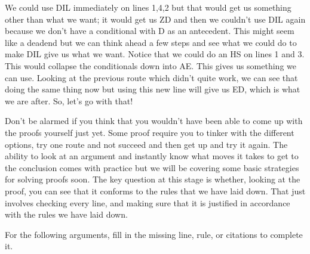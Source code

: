 We could use DIL immediately on lines 1,4,2 but that would get us something other than what we want; it would get us Z\eor D and then we couldn't use DIL again because we don't have a conditional with D as an antecedent. This might seem like a deadend but we can think ahead a few steps and see what we could do to make DIL give us what we want. Notice that we could do an HS on lines 1 and 3. This would collapse the conditionals down into A\eif E. This gives us something we can use. Looking at the previous route which didn't quite work, we can see that doing the same thing now but using this new line will give us E\eor D, which is what we are after. So, let's go with that!
\begin{fitchproof}
 
 
\end{fitchproof}

Don’t be alarmed if you think that you wouldn’t have been able to come up with the proofs yourself just yet. Some proof require you to tinker with the different options, try one route and not succeed and then get up and try it again. The ability to look at an argument and instantly know what moves it takes to get to the conclusion comes with practice but we will be covering some basic strategies for solving proofs soon. The key question at this stage is whether, looking at the proof, you can see that it conforms to the rules that we have laid down. That just involves checking every line, and making sure that it is justified in accordance with the rules we have laid down.

\practiceproblems
\problempart
\label{pr.fillinblankbasics}
For the following arguments, fill in the missing line, rule, or citations to complete it.
\begin{fitchproof}
 
\end{fitchproof}

\begin{fitchproof}
 
\end{fitchproof}


\begin{fitchproof}
 
\end{fitchproof}

\begin{fitchproof}
 \ce{,}
\end{fitchproof}

